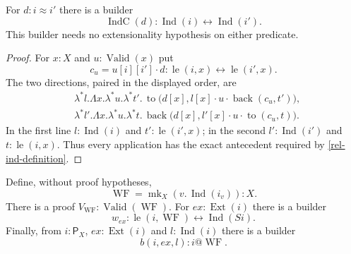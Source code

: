 \begin{lemma}
\label{rel-ind-congruence}
For $d:i\approx i'$ there is a builder
\[
 \operatorname{IndC}(d):
       \operatorname{Ind}(i)\leftrightarrow\operatorname{Ind}(i').
\]
This builder needs no extensionality hypothesis on either predicate.
\end{lemma}

\begin{proof}
For $x:X$ and $u:\operatorname{Valid}(x)$ put
\[
 c_u=u[i][i']\cdot d:
       \operatorname{le}(i,x)\leftrightarrow\operatorname{le}(i',x).
\]
The two directions, paired in the displayed order, are
\begin{align*}
 &\lambda^*l.\Lambda x.\lambda^*u.\lambda^*t'.\,
    \operatorname{to}\bigl(d[x],
       l[x]\cdot u\cdot\operatorname{back}(c_u,t')\bigr),\\
 &\lambda^*l'.\Lambda x.\lambda^*u.\lambda^*t.\,
    \operatorname{back}\bigl(d[x],
       l'[x]\cdot u\cdot\operatorname{to}(c_u,t)\bigr).
\end{align*}
In the first line $l:\operatorname{Ind}(i)$ and
$t':\operatorname{le}(i',x)$; in the second
$l':\operatorname{Ind}(i')$ and $t:\operatorname{le}(i,x)$.
Thus every application has the exact antecedent required by
\eqref{rel-ind-definition}.
\end{proof}

\begin{lemma}
\label{rel-wf}
Define, without proof hypotheses,
\[
 \operatorname{WF}=\operatorname{mk}_X(v.\,\operatorname{Ind}(i_v)):X.
\]
There is a proof $V_{\operatorname{WF}}:
\operatorname{Valid}(\operatorname{WF})$.  For
$ex:\operatorname{Ext}(i)$ there is a builder
\begin{equation}
 w_{ex}:\operatorname{le}(i,\operatorname{WF})
                       \leftrightarrow\operatorname{Ind}(Si).
 \label{rel-wf-evaluation}
\end{equation}
Finally, from $i:\mathsf P_X$, $ex:\operatorname{Ext}(i)$ and
$l:\operatorname{Ind}(i)$ there is a builder
\begin{equation}
 b(i,ex,l):i@\operatorname{WF}.
 \label{rel-induction-builder}
\end{equation}
\end{lemma}

